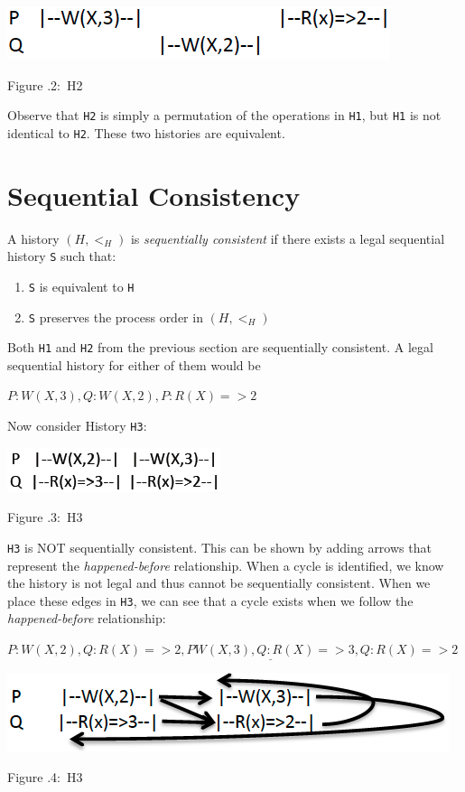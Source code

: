 \documentclass[twoside]{article}
\newcounter{lecnum}
\newcommand{\fig}[3]{
			\vspace{#2}
			\begin{center}
			Figure \thelecnum.#1:~#3
			\end{center}
	}
\begin{document}
\includegraphics{H2}
\fig{2}{2px}{H2}

Observe that {\tt H2} is simply a permutation of the operations in {\tt H1}, but {\tt H1} is not identical to {\tt H2}. These two histories are equivalent.
\section{Sequential Consistency}

A history $(H, <_H)$ is {\em sequentially consistent} if there exists a legal sequential history {\tt S} such that:
\begin{enumerate}
\item {\tt S} is equivalent to {\tt H}
\item {\tt S} preserves the process order in $(H, <_H)$
\end{enumerate}

Both {\tt H1} and {\tt H2} from the previous section are sequentially consistent. A legal sequential history for either of them would be

$P: W(X,3), Q: W(X,2), P: R(X)=>2$

Now consider History {\tt H3}:

\includegraphics{H3}
\fig{3}{2px}{H3}

\newpage

{\tt H3} is NOT sequentially consistent. This can be shown by adding arrows that represent the {\em happened-before} relationship. When a cycle is identified, we know the history is not legal and thus cannot be sequentially consistent. When we place these edges in {\tt H3}, we can see that a cycle exists when we follow the {\em happened-before} relationship:

$P: W(X,2), \underline{Q: R(X)=>2, P W(X,3), Q: R(X)=>3, Q: R(X)=>2}$

\includegraphics{H3WLines}
\fig{4}{2px}{H3}
\end{document}

